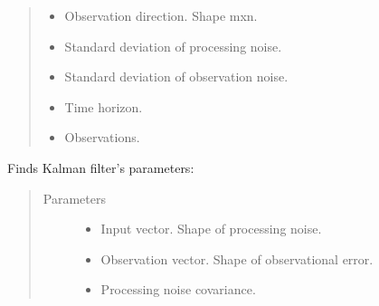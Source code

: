\documentclass[letterpaper,10pt,english]{sphinxmanual}
\begin{document}
\begin{fulllineitems}
\begin{quote}
\begin{description}
\begin{itemize}
\item {} 
\sphinxAtStartPar
{} \textendash{} Observation direction. Shape mxn.

\item {} 
\sphinxAtStartPar
{} \textendash{} Standard deviation of processing noise.

\item {} 
\sphinxAtStartPar
{} \textendash{} Standard deviation of observation noise.

\item {} 
\sphinxAtStartPar
{} \textendash{} Time horizon.

\item {} 
\sphinxAtStartPar
{} \textendash{} Observations.

\end{itemize}

\end{description}\end{quote}

\begin{fulllineitems}
\label{\detokenize{LDS.LDS.filters:LDS.LDS.filters.kalman_filtering_siso.KalmanFilteringSISO.parameters}}
\sphinxAtStartPar
Finds Kalman filter’s parameters:
\begin{quote}\begin{description}
\item[{Parameters}] \leavevmode\begin{itemize}
\item {} 
\sphinxAtStartPar
{} \textendash{} Input vector. Shape of processing noise.

\item {} 
\sphinxAtStartPar
{} \textendash{} Observation vector. Shape of observational error.

\item {} 
\sphinxAtStartPar
{} \textendash{} Processing noise covariance.


\end{itemize}
\end{description}
\end{quote}
\end{fulllineitems}
\end{fulllineitems}
\end{document}
